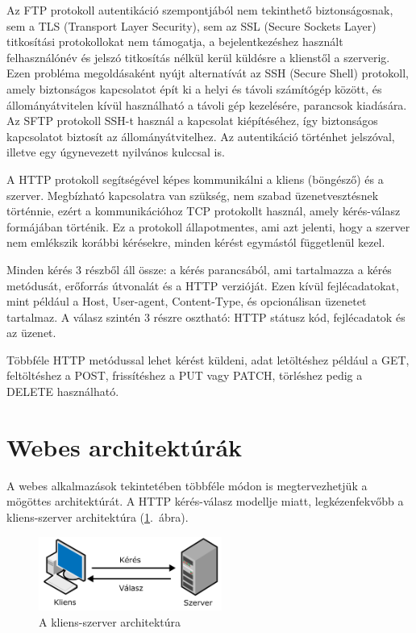 \documentclass[
]{thesis-ekf}
\theoremstyle{definition}
\theoremstyle{remark}
\begin{document}
	Az FTP protokoll autentikáció szempontjából nem tekinthető biztonságosnak, sem a TLS (Transport Layer Security), sem az SSL (Secure Sockets Layer) titkosítási protokollokat nem támogatja, a bejelentkezéshez használt felhasználónév és jelszó titkosítás nélkül kerül küldésre a klienstől a szerverig. Ezen probléma megoldásaként nyújt alternatívát az SSH (Secure Shell) protokoll, amely biztonságos kapcsolatot épít ki a helyi és távoli számítógép között, és állományátvitelen kívül használható a távoli gép kezelésére, parancsok kiadására. Az SFTP protokoll SSH-t használ a kapcsolat kiépítéséhez, így biztonságos kapcsolatot biztosít az állományátvitelhez. Az autentikáció történhet jelszóval, illetve egy úgynevezett nyilvános kulccsal is.\cite{sshprotocol}
	
	A HTTP protokoll segítségével képes kommunikálni a kliens (böngésző) és a szerver. Megbízható kapcsolatra van szükség, nem szabad üzenetvesztésnek történnie, ezért a kommunikációhoz TCP protokollt használ, amely kérés-válasz formájában történik. Ez a protokoll állapotmentes, ami azt jelenti, hogy a szerver nem emlékszik korábbi kérésekre, minden kérést egymástól függetlenül kezel.\cite{httpdocs}
	
	Minden kérés 3 részből áll össze: a kérés parancsából, ami tartalmazza a kérés metódusát, erőforrás útvonalát és a HTTP verzióját. Ezen kívül fejlécadatokat, mint például a Host, User-agent, Content-Type, és opcionálisan üzenetet tartalmaz. A válasz szintén 3 részre osztható: HTTP státusz kód, fejlécadatok és az üzenet.
	
	Többféle HTTP metódussal lehet kérést küldeni, adat letöltéshez például a GET, feltöltéshez a POST, frissítéshez a PUT vagy PATCH, törléshez pedig a DELETE használható.\cite{clientserver_overview}
	
	\section{Webes architektúrák}
	A webes alkalmazások tekintetében többféle módon is megtervezhetjük a mögöttes architektúrát.
	A HTTP kérés-válasz modellje miatt, legkézenfekvőbb a kliens-szerver architektúra (\ref{fig:kliens_szerver}.~ábra).
	
	\begin{figure}[!h]
		\centering
		\includegraphics[width=6cm]{kepek/client_server_arch_magyaritva.png}
		\caption[A kliens-szerver architektúra]{A kliens-szerver architektúra\footnotemark}
		\label{fig:kliens_szerver}
	\end{figure}
	
\end{document}
